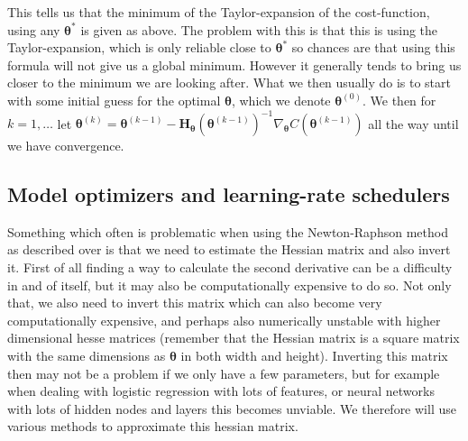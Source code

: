 \documentclass{article}
\begin{document}
This tells us that the minimum of the Taylor-expansion of the cost-function,
using any $\bm{\theta}^*$ is given as above. The problem with this is that this
is using the Taylor-expansion, which is only reliable close to $\bm{\theta}^*$ so
chances are that using this formula will not give us a global minimum. However
it generally tends to bring us closer to the minimum we are looking after. What
we then usually do is to start with some initial guess for the optimal
$\bm{\theta}$, which we denote $\bm{\theta}^{(0)}$. We then for $k=1, \dots$ let
$\bm{\theta}^{(k)} = \bm{\theta}^{(k-1)} -
      \bm{H}_{\bm{\theta}}(\bm{\theta}^{(k-1)})^{-1} \nabla_{\bm{\theta}}
      C(\bm{\theta}^{(k-1)})$ all the way until we have convergence.

\subsection{Model optimizers and learning-rate schedulers}
Something which often is problematic when using the Newton-Raphson method as
described over is that we need to estimate the Hessian matrix and also invert
it. First of all finding a way to calculate the second derivative can be a
difficulty in and of itself, but it may also be computationally expensive to do
so. Not only that, we also need to invert this matrix which can also become very
computationally expensive, and perhaps also numerically unstable with higher
dimensional hesse matrices (remember that the Hessian matrix is a square matrix
with the same dimensions as $\bm{\theta}$ in both width and height).  Inverting
this matrix then may not be a problem if we only have a few parameters, but for
example when dealing with logistic regression with lots of features, or neural
networks with lots of hidden nodes and layers this becomes unviable. We
therefore will use various methods to approximate this hessian matrix.
\end{document}
